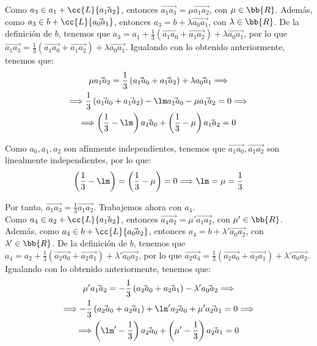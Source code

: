 \begin{ejercicio}
    Como $a_3\in a_1+\cc{L}\{\vec{a_1a_2}\}$, entonces $\vec{a_1a_3} = \mu \vec{a_1a_2}$, con $\mu \in \bb{R}$.
    Además, como $a_3\in b+\cc{L}\{\vec{a_0a_1}\}$, entonces $a_3 = b + \lambda \vec{a_0a_1}$, con $\lambda \in \bb{R}$. De la definición de $b$, tenemos que
    $a_3 = a_1 + \frac{1}{3}\left(\vec{a_1a_0} + \vec{a_1a_2}\right) + \lambda \vec{a_0a_1}$,
    por lo que $\vec{a_1a_3} = \frac{1}{3}\left(\vec{a_1a_0} + \vec{a_1a_2}\right) + \lambda \vec{a_0a_1}$. Igualando con lo obtenido anteriormente, tenemos que:
    \begin{multline*}
        \mu \vec{a_1a_2} = \frac{1}{3}\left(\vec{a_1a_0} + \vec{a_1a_2}\right) + \lambda \vec{a_0a_1} \Longrightarrow \\
        \Longrightarrow \frac{1}{3}\left(\vec{a_1a_0} + \vec{a_1a_2}\right) -\lm \vec{a_1a_0} - \mu \vec{a_1a_2} = 0 \Longrightarrow\\
        \Longrightarrow \left(\frac{1}{3}-\lm\right) \vec{a_1a_0} + \left(\frac{1}{3}-\mu\right) \vec{a_1a_2} = 0 
    \end{multline*}

    Como $a_0,a_1,a_2$ son afínmente independientes, tenemos que $\vec{a_1a_0}, \vec{a_1a_2}$ son linealmente independientes, por lo que:
    \begin{equation*}
        \left(\frac{1}{3}-\lm\right) = \left(\frac{1}{3}-\mu\right) = 0 \Longrightarrow \lm = \mu = \frac{1}{3}
    \end{equation*}

    Por tanto, $\vec{a_1a_3} = \frac{1}{3}\vec{a_1a_2}$. Trabajemos ahora con $a_4$.\\

    Como $a_4\in a_2+\cc{L}\{\vec{a_1a_2}\}$, entonces $\vec{a_4a_2} = \mu' \vec{a_1a_2}$, con $\mu' \in \bb{R}$.
    Además, como $a_4\in b+\cc{L}\{\vec{a_0a_2}\}$, entonces $a_4 = b + \lambda' \vec{a_0a_2}$, con $\lambda' \in \bb{R}$. De la definición de $b$, tenemos que
    $a_4 = a_2 + \frac{1}{3}\left(\vec{a_2a_0} + \vec{a_2a_1}\right) + \lambda' \vec{a_0a_2}$,
    por lo que $\vec{a_2a_4} = \frac{1}{3}\left(\vec{a_2a_0} + \vec{a_2a_1}\right) + \lambda' \vec{a_0a_2}$. Igualando con lo obtenido anteriormente, tenemos que:
    \begin{multline*}
        \mu' \vec{a_1a_2} = -\frac{1}{3}\left(\vec{a_2a_0} + \vec{a_2a_1}\right) - \lambda' \vec{a_0a_2} \Longrightarrow \\
        \Longrightarrow -\frac{1}{3}\left(\vec{a_2a_0} + \vec{a_2a_1}\right) +\lm' \vec{a_2a_0} + \mu' \vec{a_2a_1} = 0 \Longrightarrow\\
        \Longrightarrow \left(\lm' -\frac{1}{3}\right) \vec{a_2a_0} + \left(\mu'-\frac{1}{3}\right) \vec{a_2a_1} = 0 
    \end{multline*}


\end{ejercicio}
